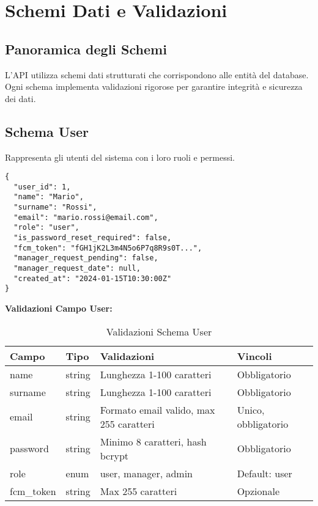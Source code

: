 \newpage

\section{Schemi Dati e Validazioni}

\subsection{Panoramica degli Schemi}
L'API utilizza schemi dati strutturati che corrispondono alle entità del database. Ogni schema implementa validazioni rigorose per garantire integrità e sicurezza dei dati.

\subsection{Schema User}
Rappresenta gli utenti del sistema con i loro ruoli e permessi.

\begin{lstlisting}[caption=Schema User Completo]
{
  "user_id": 1,
  "name": "Mario",
  "surname": "Rossi", 
  "email": "mario.rossi@email.com",
  "role": "user",
  "is_password_reset_required": false,
  "fcm_token": "fGH1jK2L3m4N5o6P7q8R9s0T...",
  "manager_request_pending": false,
  "manager_request_date": null,
  "created_at": "2024-01-15T10:30:00Z"
}
\end{lstlisting}

\textbf{Validazioni Campo User:}
\begin{table}[H]
\centering
\scriptsize
\begin{tabular}{@{}lp{3cm}p{6cm}p{3cm}@{}}
\toprule
\textbf{Campo} & \textbf{Tipo} & \textbf{Validazioni} & \textbf{Vincoli} \\
\midrule
name & string & Lunghezza 1-100 caratteri & Obbligatorio \\
surname & string & Lunghezza 1-100 caratteri & Obbligatorio \\
email & string & Formato email valido, max 255 caratteri & Unico, obbligatorio \\
password & string & Minimo 8 caratteri, hash bcrypt & Obbligatorio \\
role & enum & user, manager, admin & Default: user \\
fcm\_token & string & Max 255 caratteri & Opzionale \\
\bottomrule
\end{tabular}
\caption{Validazioni Schema User}
\end{table}

